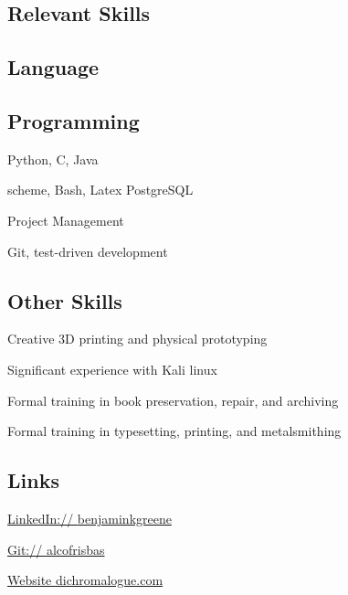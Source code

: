 \documentclass{cv}
\begin{document}
{}
\noindent{}
\begin{paracol}{2}
\begin{raggedright}
\section{Relevant Skills}
\subsection{Language}
\subsection{Programming}
\begin{closeitems}
\item Python, C, Java
\item scheme, Bash, Latex PostgreSQL
\item Project Management
\item Git, test-driven development
\end{closeitems}
\subsection{Other Skills}
\begin{closeitems}
\item Creative 3D printing and physical prototyping
\item Significant experience with Kali linux
\item Formal training in book preservation, repair, and archiving
\item Formal training in typesetting, printing, and metalsmithing
\end{closeitems}
\subsection{Links}
\begin{closeitems}
\item \href{http://www.linkedin.com/in/benjaminkgreene}{LinkedIn:// \small{benjaminkgreene}}
\item \href{http://www.github.com/alcofrisbas}{Git:// \small{alcofrisbas}}
\item \href{http://www.dichromalogue.com}{Website \small{dichromalogue.com}}
\end{closeitems}

\end{raggedright}
\end{paracol}
\end{document}
